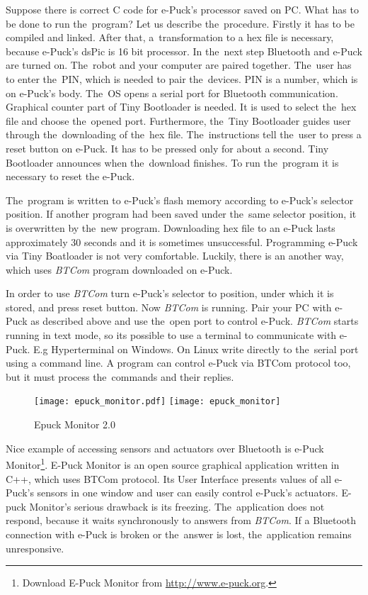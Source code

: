   Suppose there is correct C code for e-Puck's processor saved on PC. What has to be done to run the~program?
  Let us describe the~procedure.
  Firstly it has to be compiled and linked. After that, a~transformation to a hex file is necessary,
  because e-Puck's dsPic is 16 bit processor. In the~next step Bluetooth and e-Puck are turned on. 
  The~robot and your computer are paired together. The~user has to enter the~PIN, 
  which is needed to pair the~devices. 
  PIN is a number, which is on e-Puck's body.
  The~OS opens a serial port for Bluetooth communication.
  Graphical counter part of Tiny Bootloader is needed. It is used to select the~hex file and choose the~opened port. 
  Furthermore, the~Tiny Bootloader guides user through the~downloading of the~hex file.
  The~instructions tell the~user to press a reset button on e-Puck. It has to be pressed only for about a second.
  Tiny Bootloader announces when the~download finishes. To run the~program it is necessary to reset the e-Puck.
   
  The~program is written to e-Puck's flash memory according to e-Puck's selector position.
  If another program had been saved under the~same selector position, it is overwritten by the~new program.
  Downloading  hex file to an e-Puck lasts approximately 30 seconds and it is sometimes unsuccessful. 
  Programming e-Puck via Tiny Boatloader is not very comfortable. 
  Luckily, there is an another way, which uses {\it BTCom} program downloaded on e-Puck. 

  In order to use {\it BTCom} turn e-Puck's selector to position, under which it is stored, and press reset button.
  Now {\it BTCom} is running.  Pair your PC with e-Puck as described above and use the~open port
  to control e-Puck.
  {\it BTCom} starts running in text mode, so its possible to use a terminal to communicate with e-Puck.
  E.g Hyperterminal on Windows. On Linux write directly to the~serial port using a command line.
  A program can control e-Puck via BTCom protocol too, but it must process the~commands and their replies.
   

  \begin{figure}[!hbp]
  \centering
  \ifpdf
    \texttt{[image: epuck\_monitor.pdf]}
  \else
    \texttt{[image: epuck\_monitor]}
  \fi
  \caption{\label{pic:monitor}%
   Epuck Monitor 2.0}
  \end{figure}

  Nice example of accessing sensors and actuators over Bluetooth is 
  e-Puck Monitor\footnote{\small{Download E-Puck Monitor from \url{http://www.e-puck.org}.}}.
  E-Puck Monitor is an open source graphical application written in C++, 
  which uses BTCom protocol. Its User Interface presents values of all e-Puck's 
  sensors in one window and user can easily control e-Puck's actuators.
  E-puck Monitor's serious drawback is its freezing. The~application does not respond, 
  because it waits synchronously to answers from {\it BTCom}.
  If a Bluetooth connection with e-Puck is broken or the~answer is lost, 
  the~application remains unresponsive.

